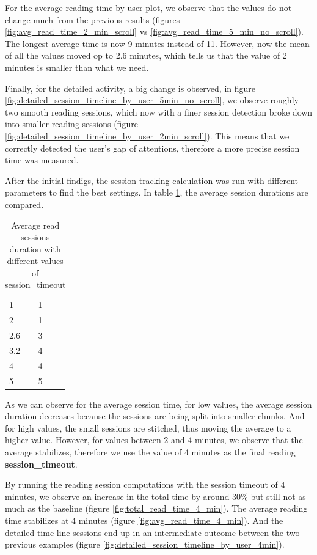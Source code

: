 For the average reading time by user plot, we observe that the values do not change much from the previous results (figures \ref{fig:avg_read_time_2_min_scroll} vs \ref{fig:avg_read_time_5_min_no_scroll}). The longest average time is now 9 minutes instead of 11. However, now the mean of all the values moved op to 2.6 minutes, which tells us that the value of 2 minutes is smaller than what we need.

Finally, for the detailed activity, a big change is observed, in figure \ref{fig:detailed_session_timeline_by_user_5min_no_scroll}, we observe roughly two smooth reading sessions, which now with a finer session detection broke down into smaller reading sessions (figure \ref{fig:detailed_session_timeline_by_user_2min_scroll}). This means that we correctly detected the user's gap of attentions, therefore a more precise session time was measured.

After the initial findigs, the session tracking calculation was run with different parameters to find the best settings. In table \ref{tb:read_session_timeouts}, the average session durations are compared.

\begin{table}[htb]
	\begin{tabularx}
		{\textwidth}{Xll}\toprule
		\tableheadline{Session\_timeout value} & \tableheadline{Avg. read session (in minutes)} \\ 
		\midrule 
		1 & 1 \\ 
		\hline 
		2 & 1 \\ 
		\hline 
		2.6 & 3 \\ 
		\hline 
		3.2 & 4 \\ 
		\hline 
		4 & 4 \\ 
		\hline 
		5 & 5 \\ 
		\hline 
	\end{tabularx} 
	\caption{Average read sessions duration with different values of session\_timeout}\label{tb:read_session_timeouts}
\end{table}

As we can observe for the average session time, for low values, the average session duration decreases because the sessions are being split into smaller chunks. And for high values, the small sessions are stitched, thus moving the average to a higher value. However, for values between 2 and 4 minutes, we observe that the average stabilizes, therefore we use the value of 4 minutes as the final reading \textbf{session\_timeout}.


By running the reading session computations with the session timeout of 4 minutes, we observe an increase in the total time by around 30\% but still not as much as the baseline (figure \ref{fig:total_read_time_4_min}). The average reading time stabilizes at 4 minutes (figure \ref{fig:avg_read_time_4_min}). And the detailed time line sessions end up in an intermediate outcome between the two previous examples (figure \ref{fig:detailed_session_timeline_by_user_4min}).

